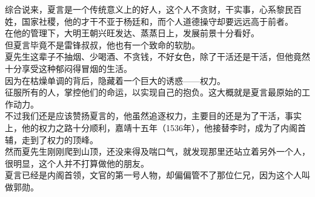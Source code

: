 \begin{multicols}{\theparacolNo}
综合说来，夏言是一个传统意义上的好人，这个人不贪财，干实事，心系黎民百姓，国家社稷，他的才干不亚于杨廷和，而个人道德操守却要远远高于前者。\\

在他的管理下，大明王朝兴旺发达、蒸蒸日上，发展前景十分看好。\\

但夏言毕竟不是雷锋叔叔，他也有一个致命的软肋。\\

夏先生这辈子不抽烟、少喝酒、不贪钱，不好女色，除了干活还是干活，但他竟然十分享受这种郁闷得冒烟的生活。\\

因为在枯燥单调的背后，隐藏着一个巨大的诱惑——权力。\\

征服所有的人，掌控他们的命运，以实现自己的抱负。这大概就是夏言最原始的工作动力。\\

不过我们还是应该赞扬夏言的，他虽然追逐权力，主要目的还是为了干活，事实上，他的权力之路十分顺利，嘉靖十五年（1536年），他接替李时，成为了内阁首辅，走到了权力的顶峰。\\

然而夏先生刚刚爬到山顶，还没来得及喘口气，就发现那里还站立着另外一个人，很明显，这个人并不打算做他的朋友。\\

夏言已经是内阁首领，文官的第一号人物，却偏偏管不了那位仁兄，因为这个人叫做郭勋。\\
\ifnum{}
	\end{multicols}
\fi
\newpage
